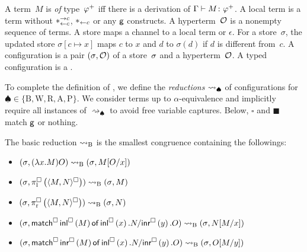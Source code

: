 {A term~$M$ is \textit{of} type~${\varphi}^+$ iff there is a derivation of
$\Gamma\vdash
{M} \colon{{\varphi}^+}$.
A local term is a term
without $\ast^{\rightarrow {c}}_{\leftarrow{c}}$,
$\ast_{\leftarrow{c}}$ or any $\mathsf{g}$ constructs.
A hyperterm~$\mathcal{O}$ is a nonempty sequence of terms.
A store maps a channel to a
local term or $\epsilon$.
For a store~$\sigma$, the updated store $\sigma[c\mapsto x]$ maps $c$ to
$x$ and $d$ to $\sigma(d)$ if $d$ is different from~$c$.
A configuration is a pair $({\sigma}{},{\mathcal{O}})$ of a
store~${\sigma}$ and a hyperterm~$\mathcal{O}$.
A typed configuration is a .

To complete the definition of \lgd,
 we define the \textit{reductions} $\rightsquigarrow_\spadesuit$ of
 configurations for $\spadesuit\in\{\mathrm B, \mathrm W, \mathrm R, \mathrm A,
 \mathrm P\}$.
 We consider terms up to $\alpha$-equivalence and implicitly
 require all instances
 of $\rightsquigarrow_\spadesuit$ to avoid free variable captures.
 Below, $\square$ and $\blacksquare$ match $\mathsf{g}$ or nothing.

\begin{definition}
 The basic reduction $\rightsquigarrow_{\mathrm B}$ is the smallest congruence containing
 the followings:
 \begin{itemize}
  \item  $({\sigma}{},{(\lambda x.M)O})\rightsquigarrow_{\mathrm B}
 ({\sigma}{},{M[O/x]})$
  \item $({\sigma}{},{\pi^{\square}_{\mathrm l}\left({\langle{M,N}\rangle^{\square}}\right)}) \rightsquigarrow_{\mathrm B}
	 ({\sigma}{},{           M   })$
  \item $({\sigma}{},{\pi^{\square}_{\mathrm r}\left({\langle{M,N}\rangle^{\square}}\right)}) \rightsquigarrow_{\mathrm B}
	 ({\sigma}{},{             N })$
  \item $({\sigma}{},{\mathsf{match}^{\square}\,{\mathsf{inl}^{\square}\left({M}\right)}\,\mathsf{of}\, \mathsf{inl}^{\square}\left({x}\right). {N}/ \mathsf{inr}^{\square}\left({y}\right). {O}}) \rightsquigarrow_{\mathrm B}
	 ({\sigma}{},{              N[M/x]})$
  \item $({\sigma}{},{\mathsf{match}^{\square}\,{\mathsf{inr}^{\square}\left({M}\right)}\,\mathsf{of}\, \mathsf{inl}^{\square}\left({x}\right). {N}/ \mathsf{inr}^{\square}\left({y}\right). {O}}) \rightsquigarrow_{\mathrm B}
	 ({\sigma}{},{                  O[M/y]})$
 \end{itemize}
\end{definition}

}
